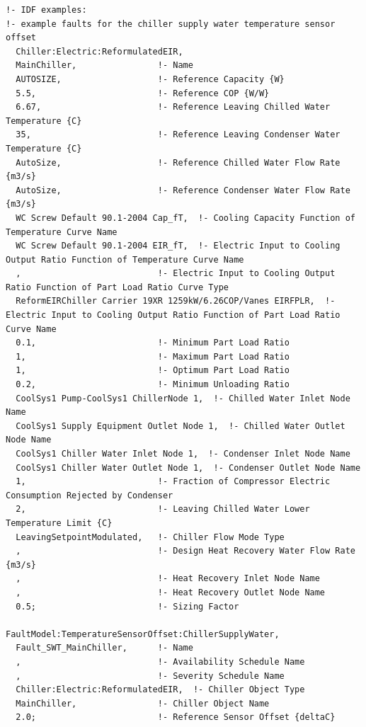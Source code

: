 \begin{lstlisting}
!- IDF examples:
!- example faults for the chiller supply water temperature sensor offset
  Chiller:Electric:ReformulatedEIR,
  MainChiller,                !- Name
  AUTOSIZE,                   !- Reference Capacity {W}
  5.5,                        !- Reference COP {W/W}
  6.67,                       !- Reference Leaving Chilled Water Temperature {C}
  35,                         !- Reference Leaving Condenser Water Temperature {C}
  AutoSize,                   !- Reference Chilled Water Flow Rate {m3/s}
  AutoSize,                   !- Reference Condenser Water Flow Rate {m3/s}
  WC Screw Default 90.1-2004 Cap_fT,  !- Cooling Capacity Function of Temperature Curve Name
  WC Screw Default 90.1-2004 EIR_fT,  !- Electric Input to Cooling Output Ratio Function of Temperature Curve Name
  ,                           !- Electric Input to Cooling Output Ratio Function of Part Load Ratio Curve Type
  ReformEIRChiller Carrier 19XR 1259kW/6.26COP/Vanes EIRFPLR,  !- Electric Input to Cooling Output Ratio Function of Part Load Ratio Curve Name
  0.1,                        !- Minimum Part Load Ratio
  1,                          !- Maximum Part Load Ratio
  1,                          !- Optimum Part Load Ratio
  0.2,                        !- Minimum Unloading Ratio
  CoolSys1 Pump-CoolSys1 ChillerNode 1,  !- Chilled Water Inlet Node Name
  CoolSys1 Supply Equipment Outlet Node 1,  !- Chilled Water Outlet Node Name
  CoolSys1 Chiller Water Inlet Node 1,  !- Condenser Inlet Node Name
  CoolSys1 Chiller Water Outlet Node 1,  !- Condenser Outlet Node Name
  1,                          !- Fraction of Compressor Electric Consumption Rejected by Condenser
  2,                          !- Leaving Chilled Water Lower Temperature Limit {C}
  LeavingSetpointModulated,   !- Chiller Flow Mode Type
  ,                           !- Design Heat Recovery Water Flow Rate {m3/s}
  ,                           !- Heat Recovery Inlet Node Name
  ,                           !- Heat Recovery Outlet Node Name
  0.5;                        !- Sizing Factor

FaultModel:TemperatureSensorOffset:ChillerSupplyWater,
  Fault_SWT_MainChiller,      !- Name
  ,                           !- Availability Schedule Name
  ,                           !- Severity Schedule Name
  Chiller:Electric:ReformulatedEIR,  !- Chiller Object Type
  MainChiller,                !- Chiller Object Name
  2.0;                        !- Reference Sensor Offset {deltaC}
\end{lstlisting}


